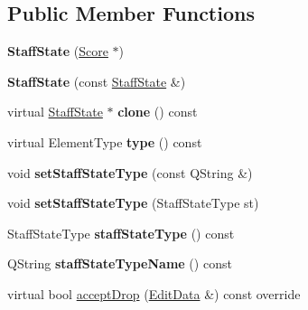 \subsection*{Public Member Functions}
\begin{DoxyCompactItemize}
\item 
\mbox{\label{class_ms_1_1_staff_state_aa45452925671283f47f0d5bbadc99f4e}} 
{\bfseries Staff\+State} (\hyperlink{class_ms_1_1_score}{Score} $\ast$)
\item 
\mbox{\label{class_ms_1_1_staff_state_ab6cff8f737d9a0c26248ba6335c59aaa}} 
{\bfseries Staff\+State} (const \hyperlink{class_ms_1_1_staff_state}{Staff\+State} \&)
\item 
\mbox{\label{class_ms_1_1_staff_state_a40b7db842096e29f39feaa399e8b33cd}} 
virtual \hyperlink{class_ms_1_1_staff_state}{Staff\+State} $\ast$ {\bfseries clone} () const
\item 
\mbox{\label{class_ms_1_1_staff_state_a983390ab170930884504b06835feec1e}} 
virtual Element\+Type {\bfseries type} () const
\item 
\mbox{\label{class_ms_1_1_staff_state_aa1ff8ececedae73fa45db8a90539b613}} 
void {\bfseries set\+Staff\+State\+Type} (const Q\+String \&)
\item 
\mbox{\label{class_ms_1_1_staff_state_aa3315fb7a1e73349e319bfa513cb8d6b}} 
void {\bfseries set\+Staff\+State\+Type} (Staff\+State\+Type st)
\item 
\mbox{\label{class_ms_1_1_staff_state_a122672aceb4138375713d881bb2d5547}} 
Staff\+State\+Type {\bfseries staff\+State\+Type} () const
\item 
\mbox{\label{class_ms_1_1_staff_state_aaab86b9cfc8d99904ca965553d82284a}} 
Q\+String {\bfseries staff\+State\+Type\+Name} () const
\item 
virtual bool \hyperlink{class_ms_1_1_staff_state_a921c2d01ac4a6528ccd68f90c4a1918b}{accept\+Drop} (\hyperlink{class_ms_1_1_edit_data}{Edit\+Data} \&) const override
\item 

\end{DoxyCompactItemize}
